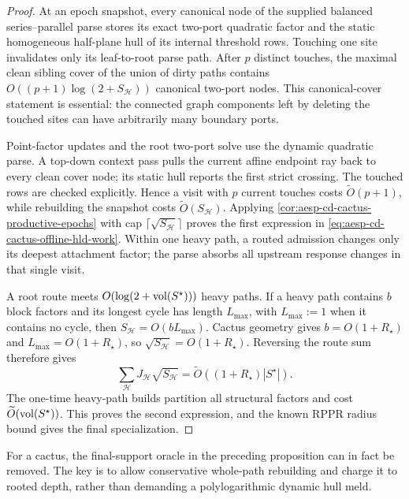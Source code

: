 \begin{proof}
At an epoch snapshot, every canonical node of the supplied balanced
series--parallel parse stores its exact two-port quadratic factor and the
static homogeneous half-plane hull of its internal threshold rows.  Touching
one site invalidates only its leaf-to-root parse path.  After $p$ distinct
touches, the maximal clean sibling cover of the union of dirty paths contains
$O((p+1)\log(2+S_{\mathcal H}))$ canonical two-port nodes.  This canonical-cover
statement is essential: the connected graph components left by deleting the
touched sites can have arbitrarily many boundary ports.

Point-factor updates and the root two-port solve use the dynamic quadratic
parse.  A top-down context pass pulls the current affine endpoint ray back to
every clean cover node; its static hull reports the first strict crossing.
The touched rows are checked explicitly.  Hence a visit with $p$ current
touches costs $\widetilde O(p+1)$, while rebuilding the snapshot costs
$\widetilde O(S_{\mathcal H})$.  Applying
\cref{cor:aesp-cd-cactus-productive-epochs} with cap
$\lceil\sqrt{S_{\mathcal H}}\rceil$ proves the first expression in
\cref{eq:aesp-cd-cactus-offline-hld-work}.  Within one heavy path, a routed
admission changes only its deepest attachment factor; the parse absorbs all
upstream response changes in that single visit.

A root route meets $O(\log(2+\operatorname{vol}(S^\star)))$ heavy paths.  If a heavy path
contains $b$ block factors and its longest cycle has length $L_{\max}$, with
$L_{\max}:=1$ when it contains no cycle, then
$S_{\mathcal H}=O(bL_{\max})$.  Cactus geometry gives
$b=O(1+R_\star)$ and $L_{\max}=O(1+R_\star)$, so
$\sqrt{S_{\mathcal H}}=O(1+R_\star)$.  Reversing the route sum therefore gives
\begin{equation*}
 \sum_{\mathcal H}J_{\mathcal H}\sqrt{S_{\mathcal H}}
 =\widetilde O\!\left(
  (1+R_\star)|S^\star|
 \right).
\end{equation*}
The one-time heavy-path builds partition all structural factors and cost
$\widetilde O(\operatorname{vol}(S^\star))$.  This proves the second expression, and the
known RPPR radius bound gives the final specialization.
\end{proof}

For a cactus, the final-support oracle in the preceding proposition can in
fact be removed.  The key is to allow conservative whole-path rebuilding and
charge it to rooted depth, rather than demanding a polylogarithmic dynamic
hull meld.

